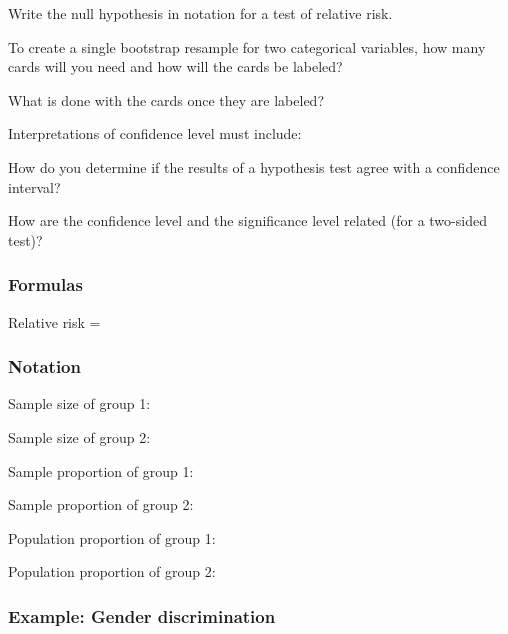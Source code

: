 \documentclass[
]{report}
\newcommand{\rgs}{\vspace{12pt}} %
\begin{document}
Write the null hypothesis in notation for a test of relative risk.
\rgs

To create a single bootstrap resample for two categorical variables, how many cards will you need and how will the cards be labeled?
\rgs

What is done with the cards once they are labeled?
\rgs

Interpretations of confidence level must include:
\rgs
\rgs

How do you determine if the results of a hypothesis test agree with a confidence interval?
\rgs
\rgs

How are the confidence level and the significance level related (for a two-sided test)?
\rgs

\hypertarget{formulas-3}{%
\subsubsection*{Formulas}\label{formulas-3}}

Relative risk =
\rgs

\hypertarget{notation}{%
\subsubsection*{Notation}\label{notation}}

Sample size of group 1:
\rgs

Sample size of group 2:
\rgs

Sample proportion of group 1:
\rgs

Sample proportion of group 2:
\rgs

Population proportion of group 1:
\rgs

Population proportion of group 2:
\rgs

\hypertarget{example-gender-discrimination}{%
\subsubsection*{Example: Gender discrimination}\label{example-gender-discrimination}}
\end{document}
